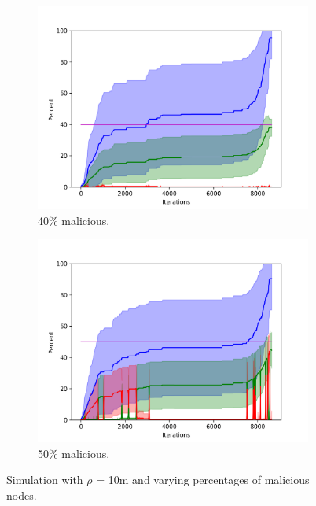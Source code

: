 \begin{figure}
\begin{subfigure}{0.45\textwidth}
\includegraphics[width=\linewidth]{images/plots/Network_rA/10_40.png}
\caption{40\% malicious.}
\end{subfigure}
\hspace*{0.1cm} %
\begin{subfigure}{0.45\textwidth}
\includegraphics[width=\linewidth]{images/plots/Network_rA/10_50.png}
\caption{50\% malicious.}
\end{subfigure}

\caption{Simulation with $\rho$ = 10m and varying percentages of malicious nodes.}
\label{fig:randommalicious}
\end{figure}


